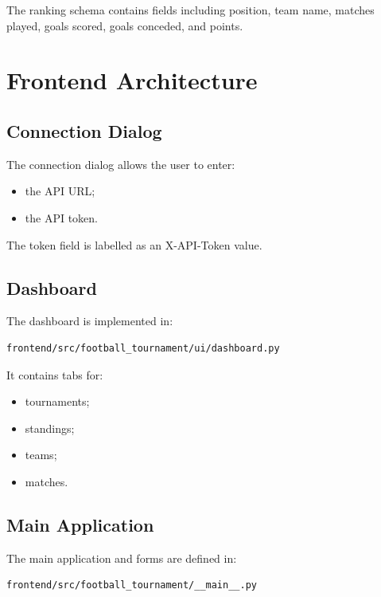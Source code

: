 \documentclass[12pt,a4paper]{article}
\begin{document}
The ranking schema contains fields including position, team name,
matches played, goals scored, goals conceded, and points.


\section{Frontend Architecture}

\subsection{Connection Dialog}

The connection dialog allows the user to enter:

\begin{itemize}
    \item the API URL;
    \item the API token.
\end{itemize}

The token field is labelled as an X-API-Token value.

\subsection{Dashboard}

The dashboard is implemented in:

\begin{lstlisting}
frontend/src/football_tournament/ui/dashboard.py
\end{lstlisting}

It contains tabs for:

\begin{itemize}
    \item tournaments;
    \item standings;
    \item teams;
    \item matches.
\end{itemize}

\subsection{Main Application}

The main application and forms are defined in:

\begin{lstlisting}
frontend/src/football_tournament/__main__.py
\end{lstlisting}
\end{document}
